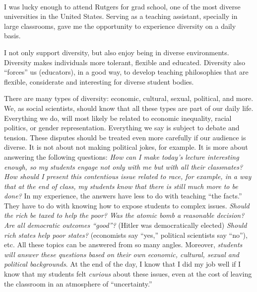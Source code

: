 \documentclass[10pt,stdletter,dateno,sigleft]{newlfm} %
\begin{document}
\begin{newlfm}




\vspace{-2cm}{\bf \huge Diversity Statement}\\

I was lucky enough to attend Rutgers for grad school, one of the most diverse universities in the United States. Serving as a teaching assistant, specially in large classrooms, gave me the opportunity to experience diversity on a daily basis. 

I not only support diversity, but also enjoy being in diverse environments. Diversity makes individuals more tolerant, flexible and educated. Diversity also ``forces'' us (educators), in a good way, to develop teaching philosophies that are flexible, considerate and interesting for diverse student bodies. 

There are many types of diversity: economic, cultural, sexual, political, and more. We, as social scientists, should know that all these types are part of our daily life. Everything we do, will most likely be related to economic inequality, racial politics, or gender representation. Everything we say is subject to debate and tension. These disputes should be treated even more carefully if our audience is diverse. It is not about not making political jokes, for example. It is more about answering the following questions: \emph{How can I make today's lecture interesting enough, so my students engage not only with me but with all their classmates? How should I present this contentious issue related to race, for example, in a way that at the end of class, my students know that there is still much more to be done?} In my experience, the answers have less to do with teaching ``the facts.'' They have to do with knowing how to expose students to complex issues. \emph{Should the rich be taxed to help the poor? Was the atomic bomb a reasonable decision? Are all democratic outcomes ``good''?} (Hitler was democratically elected) \emph{Should rich states help poor states?} (economists say ``yes,'' political scientists say ``no''), etc. All these topics can be answered from so many angles. Moreover, \emph{students will answer these questions based on their own economic, cultural, sexual and political backgrounds}. At the end of the day, I know that I did my job well if I know that my students felt \emph{curious} about these issues, even at the cost of leaving the classroom in an atmosphere of ``uncertainty.''


\end{newlfm}
\end{document}
